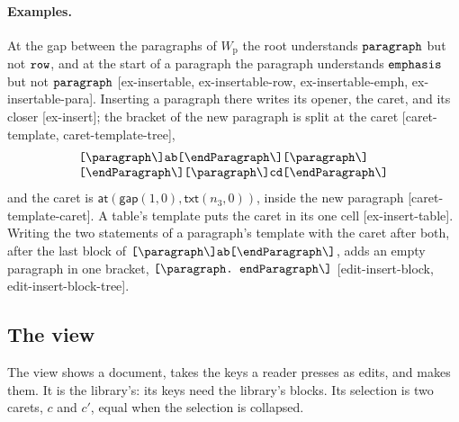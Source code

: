 \documentclass[11pt]{article}
\numberwithin{equation}{section}
\newcommand{\kw}[1]{\ensuremath{\mathsf{#1}}}
\newcommand{\str}[1]{\ensuremath{\text{\texttt{#1}}}}
\newcommand{\bs}{\textbackslash}
\begin{document}
\paragraph{Examples.}  At the gap between the paragraphs of
$W_{\mathrm{p}}$ the root understands $\str{paragraph}$ but not
$\str{row}$, and at the start of a paragraph the paragraph understands
$\str{emphasis}$ but not $\str{paragraph}$ [ex-insertable,
ex-insertable-row, ex-insertable-emph, ex-insertable-para].  Inserting a
paragraph there writes its opener, the caret, and its closer [ex-insert];
the bracket of the new paragraph is split at the caret [caret-template,
caret-template-tree],
\[
\begin{array}{@{}l@{}}
\str{[\bs{}paragraph\bs]ab[\bs{}endParagraph\bs][\bs{}paragraph\bs]} \\
\str{[\bs{}endParagraph\bs][\bs{}paragraph\bs]cd[\bs{}endParagraph\bs]}
\end{array}
\]
and the caret is $\kw{at}(\kw{gap}(1, 0), \kw{txt}(n_3, 0))$, inside the
new paragraph [caret-template-caret].  A table's template puts the caret in
its one cell [ex-insert-table].
Writing the two statements of a paragraph's template with the caret after
both, after the last block of
$\str{[\bs{}paragraph\bs]ab[\bs{}endParagraph\bs]}$, adds an empty
paragraph in one bracket, $\str{[\bs{}paragraph.\ endParagraph\bs]}$
[edit-insert-block, edit-insert-block-tree].

\subsection{The view}
\label{sec:view}

The view shows a document, takes the keys a reader presses as edits, and
makes them.  It is the library's: its keys need the library's blocks.  Its
selection is two carets, $c$ and $c'$, equal when the selection is
collapsed.
\end{document}
